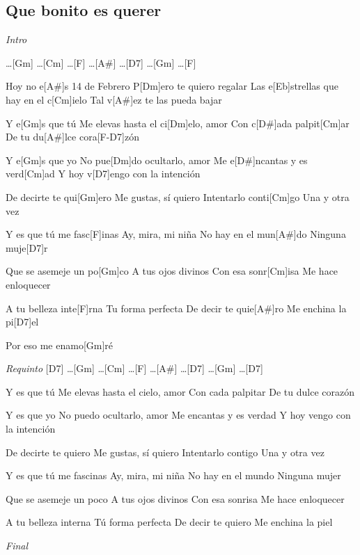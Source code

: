 \subsection{Que bonito es querer}

\noindent
\vspace{1cm}

\begin{guitar}
	\begin{multicols}{2}
		\textit{Intro}\par
		[D7] \dots [Gm] \dots [Cm] \dots [F] \dots [A#] \dots [D7] \dots [Gm] \dots [F]
		\par

		Hoy no e[A#]s 14 de Febrero
		P[Dm]ero te quiero regalar
		Las e[Eb]strellas que hay en el c[Cm]ielo
		Tal v[A#]ez te las pueda bajar

		Y e[Gm]s que tú
		Me elevas hasta el ci[Dm]elo, amor
		Con c[D#]ada palpit[Cm]ar
		De tu du[A#]lce cora[F-D7]zón 

		Y e[Gm]s que yo
		No pue[Dm]do ocultarlo, amor
		Me e[D#]ncantas y es verd[Cm]ad
		Y hoy v[D7]engo con la intención

		De decirte te qui[Gm]ero
		Me gustas, sí quiero
		Intentarlo conti[Cm]go
		Una y otra vez

		Y es que tú me fasc[F]inas
		Ay, mira, mi niña
		No hay en el mun[A#]do
		Ninguna muje[D7]r

		Que se asemeje un po[Gm]co
		A tus ojos divinos
		Con esa sonr[Cm]isa
		Me hace enloquecer

		A tu belleza inte[F]rna
		Tu forma perfecta
		De decir te quie[A#]ro
		Me enchina la pi[D7]el

		Por eso me enamo[Gm]ré

		\textit{Requinto}
		[D7] \dots [Gm] \dots [Cm] \dots [F] \dots [A#] \dots [D7] \dots [Gm] \dots [D7]
		\par

		Y es que tú
		Me elevas hasta el cielo, amor
		Con cada palpitar
		De tu dulce corazón

		Y es que yo
		No puedo ocultarlo, amor
		Me encantas y es verdad
		Y hoy vengo con la intención

		De decirte te quiero
		Me gustas, sí quiero
		Intentarlo contigo
		Una y otra vez

		Y es que tú me fascinas
		Ay, mira, mi niña
		No hay en el mundo
		Ninguna mujer

		Que se asemeje un poco
		A tus ojos divinos
		Con esa sonrisa
		Me hace enloquecer

		A tu belleza interna
		Tú forma perfecta
		De decir te quiero
		Me enchina la piel

		\par
		\textit{Final}
	\end{multicols}
\end{guitar}
